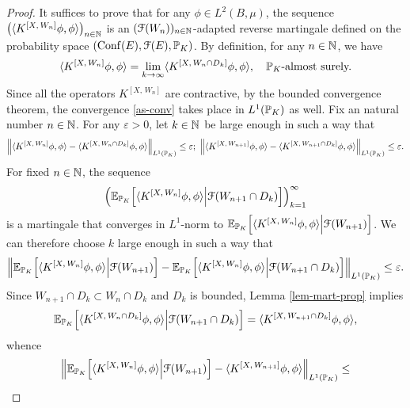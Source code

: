 \documentclass[12pt]{paper}
\numberwithin{theorem}{section}
\numberwithin{figure}{section}
\numberwithin{equation}{section}
\begin{document}
\begin{proof}
It suffices to prove that for any $\phi\in L^2(B, \mu)$, the sequence $\big(\langle  K^{[X, \, W_n]} \phi, \phi\rangle  \big)_{n\in\mathbb{N}}$
is an $(\mathcal{F}(W_n))_{n\in\mathbb{N}}$-adapted reverse martingale defined on the probability space $(\mathrm{Conf}(E), \mathcal{F}(E), \mathbb{P}_K)$. By definition, for any $n\in\mathbb{N}$, we have
\begin{align}\label{as-conv}
\langle  K^{[X, \, W_n]} \phi, \phi\rangle  = \lim_{k \to\infty} \langle  K^{[X, \, W_n\cap D_k]} \phi, \phi\rangle, \quad \text{$\mathbb{P}_K$-almost surely.}
\end{align}
Since all  the operators $K^{[X, \, W_n]}$ are contractive, by the bounded convergence theorem, the convergence  \eqref{as-conv} takes place in $L^1(\mathbb{P}_K)$ as well. Fix an natural number $n\in\mathbb{N}$.  For any $\varepsilon>0$, let $k\in\mathbb{N}$ be large enough in such a way  that
\begin{equation}
\left\| \langle  K^{[X, \, W_n]} \phi, \phi\rangle - \langle  K^{[X, \, W_n\cap D_k]} \phi, \phi\rangle\right\|_{L^1(\mathbb{P}_K)}\le \varepsilon; \
\left\| \langle  K^{[X, \, W_{n+1}]} \phi, \phi\rangle - \langle  K^{[X, \, W_{n+1}\cap D_k]} \phi, \phi\rangle\right\|_{L^1( \mathbb{P}_K)}\le \varepsilon.
\end{equation}
For fixed $n\in \mathbb{N}$, the sequence
\[
\Big(\mathbb{E}_{\mathbb{P}_K} \Big[ \langle  K^{[X, \, W_n]} \phi, \phi\rangle  \Big| \mathcal{F}(W_{n+1} \cap D_k)\Big]\Big)_{k=1}^\infty
\]
is a  martingale that converges in $L^1$-norm to  $\mathbb{E}_{\mathbb{P}_K} \Big[ \langle  K^{[X, \, W_n]} \phi, \phi\rangle  \Big| \mathcal{F}(W_{n+1})\Big]$. We can therefore choose $k$  large enough in such  a way that
\begin{align*}
\left\| \mathbb{E}_{\mathbb{P}_K} \Big[ \langle  K^{[X, \, W_n]} \phi, \phi\rangle  \Big| \mathcal{F}(W_{n+1})\Big]-    \mathbb{E}_{\mathbb{P}_K} \Big[ \langle  K^{[X, \, W_n]} \phi, \phi\rangle  \Big| \mathcal{F}(W_{n+1} \cap D_k)\Big] \right\|_{L^1(\mathbb{P}_K)}\le \varepsilon.
\end{align*}
Since $W_{n+1} \cap D_k \subset W_{n} \cap D_k$ and $D_k$ is bounded,  Lemma \ref{lem-mart-prop} implies
\[
\mathbb{E}_{\mathbb{P}_K} \Big[ \langle  K^{[X, \, W_n \cap D_k]} \phi, \phi\rangle  \Big| \mathcal{F}(W_{n+1} \cap D_k)\Big]  =  \langle  K^{[X, \, W_{n+1} \cap D_k]} \phi, \phi\rangle,
\]
whence
\begin{multline}
\left\| \E_{\PP_K} \Big[ \langle  K^{[X, \, W_n]} \phi, \phi\rangle  \Big| \mathcal{F}(W_{n+1})\Big]-  \langle  K^{[X, \, W_{n+1}]} \phi, \phi\rangle\right\|_{L^1(\PP_K)}\le \\

\end{multline}
\end{proof}
\end{document}
